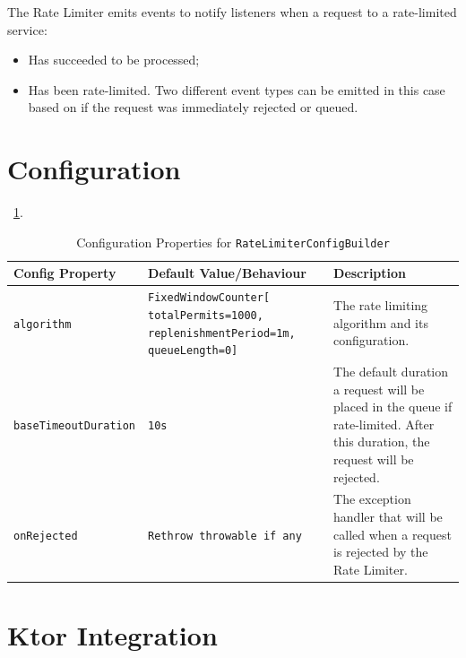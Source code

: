The Rate Limiter emits events to notify listeners when a request to a rate-limited service:

\begin{itemize}
    \item Has succeeded to be processed;
    \item Has been rate-limited.
    Two different event types can be emitted in this case based on if the request was immediately rejected or queued.
\end{itemize}


\section{Configuration}\label{sec:rate-limiter-configuration}

~\ref{tab:ratelimiter-config-builder}.

\begin{table}[!htb]
    \centering
    \caption{Configuration Properties for \texttt{RateLimiterConfigBuilder}}
    \label{tab:ratelimiter-config-builder}
    \vspace{0.3cm}
    \begin{tabular}{|p{5cm}|p{5cm}|p{6cm}|}
        \hline
        \textbf{Config Property} & \textbf{Default Value/Behaviour}                                                       & \textbf{Description}                               \\ \hline
        \texttt{algorithm}       & \texttt{FixedWindowCounter[ totalPermits=1000, replenishmentPeriod=1m, queueLength=0]} & The rate limiting algorithm and its configuration.                                                                                                         \\ \hline
        \texttt{baseTimeoutDuration} & \texttt{10s} & The default duration a request will be placed in the queue
        if rate-limited.
        After this duration, the request will be rejected. \\ \hline
        \texttt{onRejected} & \texttt{Rethrow throwable
        if any} & The exception handler that will be called when a request is rejected by the Rate Limiter. \\ \hline
    \end{tabular}
\end{table}

\resilienceMechanismDefaultConfig


\section{Ktor Integration}\label{sec:rate-limiter-ktor-integration}

